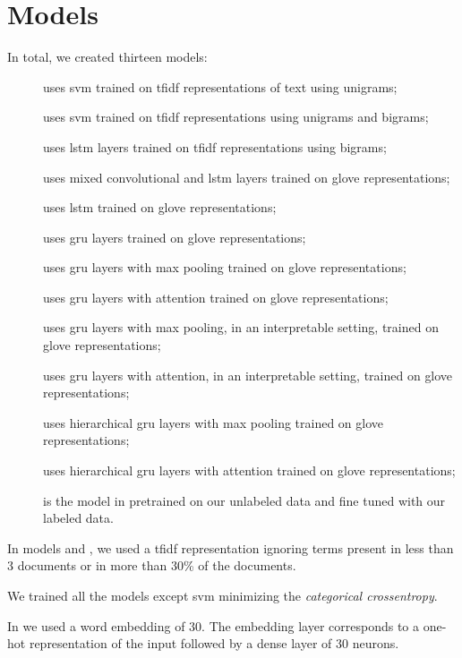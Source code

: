 \section{Models}\label{sec:models}
In total, we created thirteen models:
\begin{description}
\item[\svm] uses \ac{svm} trained on \ac{tfidf} representations of text
  using unigrams;
\item[\svmb] uses \ac{svm} trained on \ac{tfidf} representations
  using unigrams and bigrams;
\item[\lstmng] uses \ac{lstm} layers trained on \ac{tfidf} representations using
  bigrams;
\item[\lstmc] uses mixed convolutional and \ac{lstm} layers trained on
  \ac{glove} representations;
\item[\lstmb] uses \ac{lstm} trained on \ac{glove} representations;
\item[\gru] uses \ac{gru} layers trained on \ac{glove} representations;
\item[\maxp] uses \ac{gru} layers with max pooling trained on \ac{glove}
  representations;
\item[\softmax] uses \ac{gru} layers with attention trained on \ac{glove}
  representations;
\item[\maxi] uses \ac{gru} layers with max pooling, in an interpretable setting, trained on \ac{glove}
  representations;
\item[\softmaxi] uses \ac{gru} layers with attention, in an interpretable setting, trained on \ac{glove}
  representations;
\item[\maxh] uses hierarchical \ac{gru} layers with max pooling trained on \ac{glove}
  representations;
\item[\softmaxh] uses hierarchical \ac{gru} layers with attention trained on \ac{glove}
  representations;
\item[\bert] is the model in \cite{devlin2018bert} pretrained
  on our unlabeled data and fine tuned with our labeled data.
\end{description}

In models \svm{} and \svmb{}, we used a \ac{tfidf}
representation ignoring terms present in less
than 3 documents or in
more than 30\% of the documents. 

We trained all the models except \ac{svm} minimizing
the \emph{categorical crossentropy}.

In \lstmng{} we used a word embedding of $30$. The
embedding layer corresponds to a one-hot representation of the input
followed by a dense layer of $30$ neurons.

